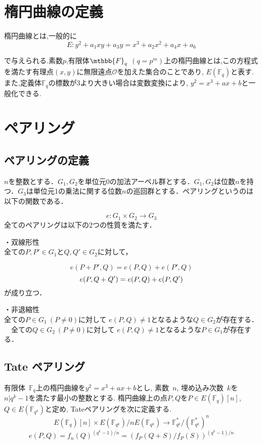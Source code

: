 \documentclass[twocolumn]{jsarticle} %
\begin{document}
\section{楕円曲線の定義}
楕円曲線とは,一般的に
\vspace{-2mm}
\[
E:y^2+a_1xy+a_3y=x^3+a_2x^2+a_4x+a_6
\]

で与えられる.素数$p$,有限体$\mthbb {F}_q$ $(q=p^m)$上の楕円曲線とは,この方程式を満たす有理点$(x,y)$に無限遠点$\mathcal{O}$を加えた集合のことであり, $E(\mathbb {F}_q)$と表す. また,定義体$\mathbb {F}_q$の標数が3より大きい場合は変数変換により, $y^2=x^3+ax+b$と一般化できる.
\section{ペアリング}

\subsection{ペアリングの定義}
$n$を整数とする．$G_1,G_2$を単位元0の加法アーベル群とする．$G_1,G_2$は位数$n$を持つ．$G_3$は単位元1の乗法に関する位数$n$の巡回群とする．ペアリングというのは以下の関数である．

\[
e:G_1\times G_2\longrightarrow G_3
\]
全てのペアリングは以下の2つの性質を満たす．\\

\item ・双線形性 \\
全ての$P,P' \in G_{1}$と$Q,Q' \in G_{2}$に対して，

\[
e(P+P',Q) = e(P,Q) + e(P',Q)
\]
\[
e(P,Q+Q') = e(P,Q) + e(P,Q') \\
\]
が成り立つ．\\

\item ・非退縮性 \\

全ての$P \in G_{1} \ (P \not= 0)$に対して $e(P,Q) \not= 1$となるような$Q \in G_{2}$が存在する．\\
　全ての$Q \in G_{2} \ (P \not= 0)$に対して $e(P,Q) \not= 1$となるような$P \in G_{1}$が存在する．
\subsection{Tate ペアリング}
有限体\ $\mathbb{F}_q$上の楕円曲線を$y^2=x^3+ax+b$とし, 素数\ $n$, 埋め込み次数\ $k$を$n|q^k-1$を満たす最小の整数とする. 楕円曲線上の点$P,Q$を$P\in E(\mathbb{F}_q)[n]$,\ $Q\in E(\mathbb{F}_{q^k})$と定め, Tateペアリングを次に定義する.
\vspace{2mm}
\[
E(\mathbb{F}_q)[n]\times E(\mathbb{F}_{q^k})/nE(\mathbb{F}_{q^k})\rightarrow \mathbb{F}_{q^k}^{*}/(\mathbb{F}_{q^k}^{*})^n
\]
\vspace{-6mm}
\[e(P,Q)=f_{n}(Q)^{{(q^k-1)/n}}=(f_P(Q+S)/f_P(S))^{(q^k-1)/n}\]
\end{document}
